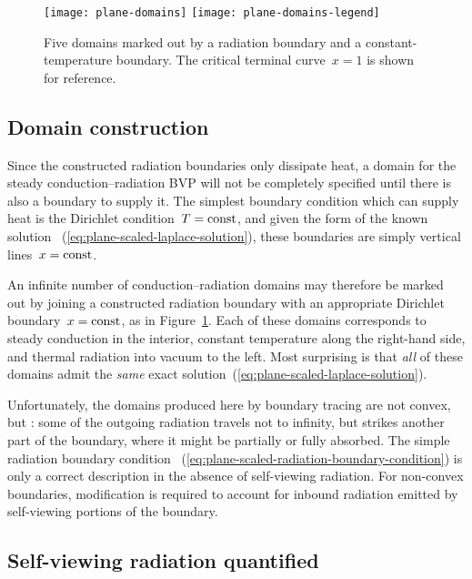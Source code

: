 \begin{figure}
  \centering
  \texttt{[image: plane-domains]}
  \texttt{[image: plane-domains-legend]}
  \caption{
    Five domains marked out by a radiation boundary
    and a constant-temperature boundary.
    The critical terminal curve~$x = 1$ is shown for reference.
  }
  \label{fig:plane-domains}
\end{figure}

\subsection{Domain construction}
\label{sec:cartesian.plane.domain}

Since the constructed radiation boundaries only dissipate heat,
a domain for the steady conduction--radiation BVP
will not be completely specified
until there is also a boundary to supply it.
The simplest boundary condition which can supply heat
is the Dirichlet condition~$T = \mathrm{const}$,
and given the form of the known solution~%
  (\ref{eq:plane-scaled-laplace-solution}),
these boundaries are simply vertical lines~$x = \mathrm{const}$.

An infinite number of conduction--radiation domains
may therefore be marked out
by joining a constructed radiation boundary
with an appropriate Dirichlet boundary~$x = \mathrm{const}$,
as in Figure~\ref{fig:plane-domains}.
Each of these domains corresponds to steady conduction in the interior,
constant temperature along the right-hand side,
and thermal radiation into vacuum to the left.
Most surprising is that \emph{all} of these domains
admit the \emph{same} exact solution~(\ref{eq:plane-scaled-laplace-solution}).

Unfortunately,
the domains produced here by boundary tracing are not convex,
but :
some of the outgoing radiation travels not to infinity,
but strikes another part of the boundary,
where it might be partially or fully absorbed.
The simple radiation boundary condition~%
  (\ref{eq:plane-scaled-radiation-boundary-condition})
is only a correct description in the absence of self-viewing radiation.
For non-convex boundaries,
modification is required to account for inbound radiation
emitted by self-viewing portions of the boundary.

\subsection{Self-viewing radiation quantified}
\label{sec:cartesian.plane.self-viewing}

